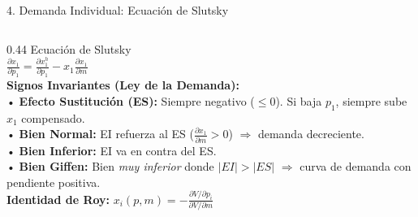 \documentclass[aspectratio=169, 10pt]{beamer}
\begin{document}
\begin{frame}{4. Demanda Individual: Ecuación de Slutsky}
\begin{columns}[T]
    \begin{column}{0.44\textwidth}
      {\scriptsize\color{grisTexto}Ecuación de Slutsky}\\[1pt]
      {\large\color{azulPrincipal}\textbf{\(\frac{\partial x_1}{\partial p_1} = \frac{\partial x_1^h}{\partial p_1} - x_1 \frac{\partial x_1}{\partial m}\)}}\\[6pt]
      {\scriptsize
        \textbf{Signos Invariantes (Ley de la Demanda):}\\
        • \textbf{Efecto Sustitución (ES):} Siempre negativo (\(\le 0\)). Si baja \(p_1\), siempre sube \(x_1\) compensado.\\
        • \textbf{Bien Normal:} EI refuerza al ES (\(\frac{\partial x_1}{\partial m} > 0\)) \(\Rightarrow\) demanda decreciente.\\
        • \textbf{Bien Inferior:} EI va en contra del ES.\\
        • \textbf{Bien Giffen:} Bien \textit{muy inferior} donde \(|EI| > |ES|\) \(\Rightarrow\) curva de demanda con pendiente positiva.\\[4pt]
        \textbf{Identidad de Roy:} \(x_i(p,m) = -\frac{\partial V/\partial p_i}{\partial V/\partial m}\)
      }
    \end{column}
  \end{columns}

\end{frame}
\end{document}
